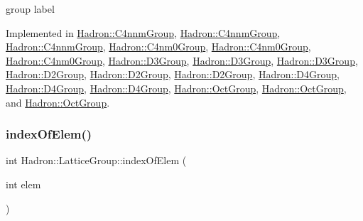 group label 

Implemented in \mbox{\hyperlink{structHadron_1_1C4nnmGroup_a9f35739dbd3ad6effd0e675d40b5341d}{Hadron\+::\+C4nnm\+Group}}, \mbox{\hyperlink{structHadron_1_1C4nnmGroup_a9f35739dbd3ad6effd0e675d40b5341d}{Hadron\+::\+C4nnm\+Group}}, \mbox{\hyperlink{structHadron_1_1C4nnmGroup_a9f35739dbd3ad6effd0e675d40b5341d}{Hadron\+::\+C4nnm\+Group}}, \mbox{\hyperlink{structHadron_1_1C4nm0Group_a2a84060776245ed0045a7271b00064eb}{Hadron\+::\+C4nm0\+Group}}, \mbox{\hyperlink{structHadron_1_1C4nm0Group_a2a84060776245ed0045a7271b00064eb}{Hadron\+::\+C4nm0\+Group}}, \mbox{\hyperlink{structHadron_1_1C4nm0Group_a2a84060776245ed0045a7271b00064eb}{Hadron\+::\+C4nm0\+Group}}, \mbox{\hyperlink{structHadron_1_1D3Group_a60e24b1e2d17481b7ab94860c95ce155}{Hadron\+::\+D3\+Group}}, \mbox{\hyperlink{structHadron_1_1D3Group_a60e24b1e2d17481b7ab94860c95ce155}{Hadron\+::\+D3\+Group}}, \mbox{\hyperlink{structHadron_1_1D3Group_a60e24b1e2d17481b7ab94860c95ce155}{Hadron\+::\+D3\+Group}}, \mbox{\hyperlink{structHadron_1_1D2Group_aa6d99edf22f99550602f38437aadd890}{Hadron\+::\+D2\+Group}}, \mbox{\hyperlink{structHadron_1_1D2Group_aa6d99edf22f99550602f38437aadd890}{Hadron\+::\+D2\+Group}}, \mbox{\hyperlink{structHadron_1_1D2Group_aa6d99edf22f99550602f38437aadd890}{Hadron\+::\+D2\+Group}}, \mbox{\hyperlink{structHadron_1_1D4Group_ae6c08a58023532bcf277f60c1dddde4f}{Hadron\+::\+D4\+Group}}, \mbox{\hyperlink{structHadron_1_1D4Group_ae6c08a58023532bcf277f60c1dddde4f}{Hadron\+::\+D4\+Group}}, \mbox{\hyperlink{structHadron_1_1D4Group_ae6c08a58023532bcf277f60c1dddde4f}{Hadron\+::\+D4\+Group}}, \mbox{\hyperlink{structHadron_1_1OctGroup_a0d21b9bbc5cc2cafa4945e9dd5608a6b}{Hadron\+::\+Oct\+Group}}, \mbox{\hyperlink{structHadron_1_1OctGroup_a0d21b9bbc5cc2cafa4945e9dd5608a6b}{Hadron\+::\+Oct\+Group}}, and \mbox{\hyperlink{structHadron_1_1OctGroup_a0d21b9bbc5cc2cafa4945e9dd5608a6b}{Hadron\+::\+Oct\+Group}}.

\mbox{\label{structHadron_1_1LatticeGroup_a4a664d3cbcc8a3b1634e4eb8434f1199}} 
\subsubsection{\texorpdfstring{indexOfElem()}{indexOfElem()}\hspace{0.1cm}{\footnotesize\ttfamily [1/3]}}
{\footnotesize\ttfamily int Hadron\+::\+Lattice\+Group\+::index\+Of\+Elem (\begin{DoxyParamCaption}\item[{int}]{elem }\end{DoxyParamCaption})\hspace{0.3cm}{\ttfamily [inline]}}

